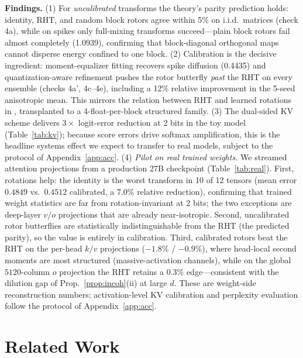 \documentclass{article}
\begin{document}
\textbf{Findings.} (1) For \emph{uncalibrated} transforms the theory's parity
prediction holds: identity, RHT, and random block rotors agree within 5\% on
i.i.d.\ matrices (check 4a), while on spikes only full-mixing transforms
succeed---plain block rotors fail almost completely (1.0939), confirming that
block-diagonal orthogonal maps cannot disperse energy confined to one block.
(2) Calibration is the decisive ingredient: moment-equalizer fitting
recovers spike diffusion (0.4435) and quantization-aware refinement pushes the
rotor butterfly \emph{past} the RHT on every ensemble (checks 4a', 4c--4e),
including a 12\% relative improvement in the 5-seed anisotropic mean. This
mirrors the relation between RHT and learned rotations in
\citet{liu2024spinquant}, transplanted to a 4-float-per-block structured
family. (3) The dual-sided KV scheme delivers $3\times$ logit-error reduction
at 2 bits in the toy model (Table~\ref{tab:kv}); because score errors drive
softmax amplification, this is the headline systems effect we expect to
transfer to real models, subject to the protocol of Appendix~\ref{app:acc}.
(4) \emph{Pilot on real trained weights.} We streamed attention projections
from a production 27B checkpoint (Table~\ref{tab:real}). First, rotations
help: the identity is the worst transform in 10 of 12 tensors (mean error
$0.4849$ vs.\ $0.4512$ calibrated, a $7.0\%$ relative reduction), confirming
that trained weight statistics are far from rotation-invariant at 2 bits; the
two exceptions are deep-layer $v/o$ projections that are already near-isotropic.
Second, uncalibrated rotor butterflies are statistically indistinguishable
from the RHT (the predicted parity), so the value is entirely in calibration.
Third, calibrated rotors beat the RHT on the per-head $k/v$ projections
($-1.8\%$ / $-0.9\%$), where head-local second moments are most structured
(massive-activation channels), while on the global $5120$-column $o$
projection the RHT retains a $0.3\%$ edge---consistent with the dilution gap
of Prop.~\ref{prop:incoh}(ii) at large $d$. These are weight-side
reconstruction numbers; activation-level KV calibration and perplexity
evaluation follow the protocol of Appendix~\ref{app:acc}.

\section{Related Work}
\label{sec:related}
\end{document}
